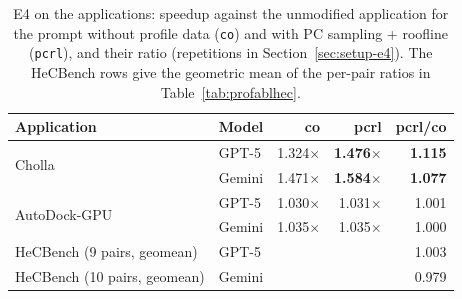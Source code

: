 \begin{table}[t]
\centering
\footnotesize
\caption{E4 on the applications: speedup against the unmodified application for the prompt without
  profile data (\texttt{co}) and with PC sampling + roofline (\texttt{pcrl}), and their ratio
  (repetitions in Section~\ref{sec:setup-e4}). The HeCBench rows give the geometric mean of the
  per-pair ratios in Table~\ref{tab:profablhec}.}
\label{tab:profabl}
\setlength{\tabcolsep}{2pt}
\begin{tabular}{@{}llrrr@{}}
\toprule
\textbf{Application} & \textbf{Model} & \textbf{co} & \textbf{pcrl} & \textbf{pcrl/co} \\
\midrule
\multirow{2}{*}{Cholla}
  & GPT-5  & 1.324$\times$ & \textbf{1.476}$\times$ & \textbf{1.115} \\
  & Gemini & 1.471$\times$ & \textbf{1.584}$\times$ & \textbf{1.077} \\
\midrule
\multirow{2}{*}{AutoDock-GPU}
  & GPT-5  & 1.030$\times$ & 1.031$\times$ & 1.001 \\
  & Gemini & 1.035$\times$ & 1.035$\times$ & 1.000 \\
\midrule
HeCBench (9 pairs, geomean)  & GPT-5  & & & 1.003 \\
HeCBench (10 pairs, geomean) & Gemini & & & 0.979 \\
\bottomrule
\end{tabular}
\end{table}

